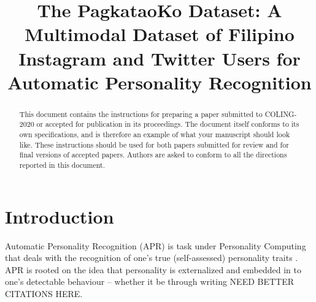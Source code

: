 \documentclass[11pt]{article}
\title{The PagkataoKo Dataset: A Multimodal Dataset of Filipino Instagram and Twitter Users for Automatic Personality Recognition}
\author{Edward Tighe\thanks{~The corresponding author.} , Luigi Acorda , Alexander Agno , Jesah Gano , \\ 
{\bf Timothy Go , Gabriel Santiago \and Claude Sedillo} \\
  College of Computer Studies, De La Salle University \\
  2401 Taft Avenue, Malate, Manila, Philippines \\
  {\tt \{edward.tighe, luigi\_acorda, alexander\_agno, jesah\_gano,} \\
  {\tt timothy\_go, gabriel\_santiago, claude\_sedillo\}@dlsu.edu.ph} \\}
\date{}
\begin{document}
\maketitle
\begin{abstract}
  This document contains the instructions for preparing a paper submitted
  to COLING-2020 or accepted for publication in its proceedings. The document itself
  conforms to its own specifications, and is therefore an example of
  what your manuscript should look like. These instructions should be
  used for both papers submitted for review and for final versions of
  accepted papers. Authors are asked to conform to all the directions
  reported in this document.
\end{abstract}

%
% 

\section{Introduction} %
\label{intro}
Automatic Personality Recognition (APR) is task under Personality Computing that deals with the recognition of one's true (self-assessed) personality traits \cite{vinciarelli2014survey}. APR is rooted on the idea that personality is externalized and embedded in to one's detectable behaviour -- whether it be through writing \cite{vinciarelli2014survey} NEED BETTER CITATIONS HERE.
\end{document}
